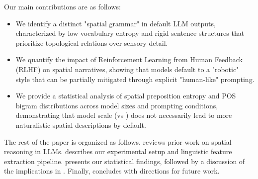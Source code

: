 Our main contributions are as follows:
\begin{itemize}[leftmargin=*,itemsep=0pt,topsep=0pt]
    \item We identify a distinct "spatial grammar" in default LLM outputs, characterized by low vocabulary entropy and rigid sentence structures that prioritize topological relations over sensory detail.
    \item We quantify the impact of Reinforcement Learning from Human Feedback (RLHF) on spatial narratives, showing that models default to a "robotic" style that can be partially mitigated through explicit "human-like" prompting.
    \item We provide a statistical analysis of spatial preposition entropy and POS bigram distributions across model sizes and prompting conditions, demonstrating that model scale (\gpto vs \gptom) does not necessarily lead to more naturalistic spatial descriptions by default.
\end{itemize}

The rest of the paper is organized as follows.  reviews prior work on spatial reasoning in LLMs.  describes our experimental setup and linguistic feature extraction pipeline.  presents our statistical findings, followed by a discussion of the implications in . Finally,  concludes with directions for future work.
